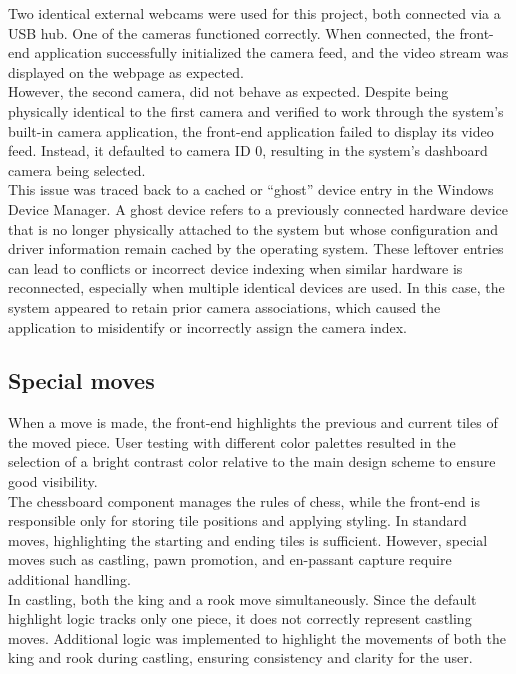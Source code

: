 Two identical external webcams were used for this project, both connected via a USB hub. One of the cameras functioned correctly. When connected, the front-end application successfully initialized the camera feed, and the video stream was displayed on the webpage as expected.\\

However, the second camera, did not behave as expected. Despite being physically identical to the first camera and verified to work through the system's built-in camera application, the front-end application failed to display its video feed. Instead, it defaulted to camera ID 0, resulting in the system's dashboard camera being selected.\\

This issue was traced back to a cached or “ghost” device entry in the Windows Device Manager. A ghost device refers to a previously connected hardware device that is no longer physically attached to the system but whose configuration and driver information remain cached by the operating system. These leftover entries can lead to conflicts or incorrect device indexing when similar hardware is reconnected, especially when multiple identical devices are used. In this case, the system appeared to retain prior camera associations, which caused the application to misidentify or incorrectly assign the camera index.

\subsection{Special moves}
When a move is made, the front-end highlights the previous and current tiles of the moved piece. User testing with different color palettes resulted in the selection of a bright contrast color relative to the main design scheme to ensure good visibility. \\

The chessboard component manages the rules of chess, while the front-end is responsible only for storing tile positions and applying styling. In standard moves, highlighting the starting and ending tiles is sufficient. However, special moves such as \gls{castling}, pawn \gls{promotion}, and \gls{en-passant} capture require additional handling. \\

In \gls{castling}, both the king and a rook move simultaneously. Since the default highlight logic tracks only one piece, it does not correctly represent \gls{castling} moves. Additional logic was implemented to highlight the movements of both the king and rook during \gls{castling}, ensuring consistency and clarity for the user.